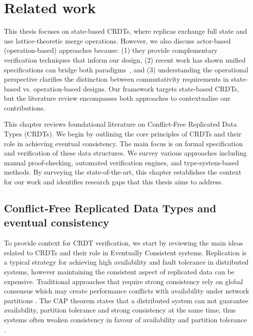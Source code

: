 

\chapter{Related work}\label{cha:related-work}

This thesis focuses on state-based CRDTs, where replicas exchange full state and use lattice-theoretic merge operations. However, we also discuss actor-based (operation-based) approaches because: (1) they provide complementary verification techniques that inform our design, (2) recent work has shown unified specifications can bridge both paradigms~\cite{nieto2023modular}, and (3) understanding the operational perspective clarifies the distinction between commutativity requirements in state-based vs. operation-based designs. Our framework targets state-based CRDTs, but the literature review encompasses both approaches to contextualize our contributions.

This chapter reviews foundational literature on Conflict-Free Replicated Data Types (CRDTs). We begin by outlining the core principles of CRDTs and their role in achieving eventual consistency. The main focus is on formal specification and verification of these data structures. We survey various approaches including manual proof-checking, automated verification engines, and type-system-based methods. By surveying the state-of-the-art, this chapter establishes the context for our work and identifies research gaps that this thesis aims to address.

\section{Conflict‐Free Replicated Data Types and eventual consistency}

To provide context for CRDT verification, we start by reviewing the main ideas related to CRDTs and their role in Eventually Consistent systems. Replication is a typical strategy for achieving high availability and fault tolerance in distributed systems, however maintaining the consistent aspect of replicated data can be expensive. Traditional approaches that require strong consistency rely on global consensus which may create performance conflicts with availability under network partitions \cite{shapiro2011conflict}. The CAP theorem states that a distributed system can not guarantee availability, partition tolerance and strong consistency at the same time, thus systems often weaken consistency in favour of availability and partition tolerance \cite{zeller2014formal}.

